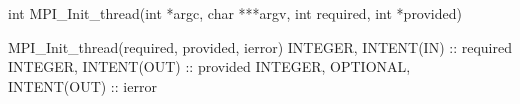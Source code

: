 int MPI_Init_thread(int *argc, char ***argv, int required, int *provided)

MPI_Init_thread(required, provided, ierror)
INTEGER, INTENT(IN) :: required
INTEGER, INTENT(OUT) :: provided
INTEGER, OPTIONAL, INTENT(OUT) :: ierror
